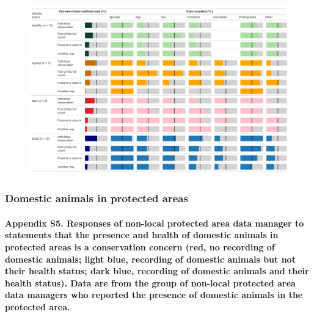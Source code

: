 \documentclass[
  letterpaper,
  DIV=11,
  numbers=noendperiod]{scrartcl}
\let\oldparagraph\paragraph
\renewcommand{\paragraph}[1]{\oldparagraph{#1}\mbox{}}
\begin{document}
\begin{figure}[H]

{\centering \includegraphics[width=6.25in,height=\textheight]{plots/appedix_plot_3.png}

}

\end{figure}

\newpage

\hypertarget{domestic-animals-in-protected-areas}{%
\subsubsection{Domestic animals in protected
areas}\label{domestic-animals-in-protected-areas}}

\hypertarget{appendix-s5.-responses-of-non-local-protected-area-data-manager-to-statements-that-the-presence-and-health-of-domestic-animals-in-protected-areas-is-a-conservation-concern-red-no-recording-of-domestic-animals-light-blue-recording-of-domestic-animals-but-not-their-health-status-dark-blue-recording-of-domestic-animals-and-their-health-status.-data-are-from-the-group-of-non-local-protected-area-data-managers-who-reported-the-presence-of-domestic-animals-in-the-protected-area.}{%
\paragraph{Appendix S5. Responses of non-local protected area data
manager to statements that the presence and health of domestic animals
in protected areas is a conservation concern (red, no recording of
domestic animals; light blue, recording of domestic animals but not
their health status; dark blue, recording of domestic animals and their
health status). Data are from the group of non-local protected area data
managers who reported the presence of domestic animals in the protected
area.}\label{appendix-s5.-responses-of-non-local-protected-area-data-manager-to-statements-that-the-presence-and-health-of-domestic-animals-in-protected-areas-is-a-conservation-concern-red-no-recording-of-domestic-animals-light-blue-recording-of-domestic-animals-but-not-their-health-status-dark-blue-recording-of-domestic-animals-and-their-health-status.-data-are-from-the-group-of-non-local-protected-area-data-managers-who-reported-the-presence-of-domestic-animals-in-the-protected-area.}}
\end{document}
